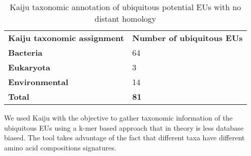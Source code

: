 \begin{table}[]
\centering
\caption{Kaiju taxonomic annotation of ubiquitous potential EUs with no distant homology}
\label{my-label}
\begin{tabular}{ll}
\textbf{Kaiju taxonomic assignment} & \textbf{Number of ubiquitous EUs} \\
\textbf{Bacteria} & 64 \\
\textbf{Eukaryota} & 3 \\
\textbf{Environmental} & 14 \\
\textbf{Total} & \textbf{81}
\end{tabular}
\end{table}

We used Kaiju with the objective to gather taxonomic information of the ubiquitous EUs using a k-mer based approach that in theory is less database biased. The tool takes advantage of the fact that different taxa have different amino acid compositions signatures.\\

